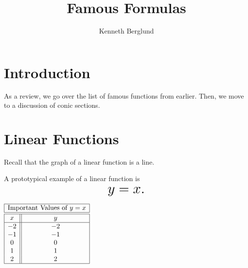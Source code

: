 \documentclass[nooutcomes]{ximera}
\author{Kenneth Berglund}
\title{Famous Formulas}
\begin{document}
\begin{abstract}
  
\end{abstract}
\maketitle

\section{Introduction}
As a review, we go over the list of famous functions from earlier. Then, we move to a discussion of conic sections. 




\section{Linear Functions}
Recall that the graph of a linear function is a line. 

\begin{example}
A prototypical example of a linear function is $$ \mbox{\huge $y=x.$}$$ 

\begin{image}
\end{image}

\begin{center}
\(
\begin{array}{ |c || c|  }
 \hline
 \multicolumn{2}{|c|}{\text{\normalfont Important Values of } y=x} \\
\hline
 \hline
 x & y\\
 \hline
 -2&-2\\
 -1&-1\\
 0&0\\
 1&1\\
 2&2\\
 \hline
\end{array}
\)
\end{center}
\end{example}
\end{document}
